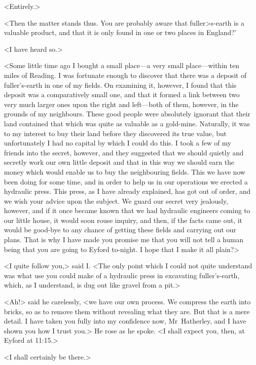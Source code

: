<Entirely.>

<Then the matter stands thus. You are probably aware that fuller>s-earth is a valuable product, and that it is only found in one or two places in England?'

<I have heard so.>

<Some little time ago I bought a small place—a very small place—within ten miles of Reading. I was fortunate enough to discover that there was a deposit of fuller's-earth in one of my fields. On examining it, however, I found that this deposit was a comparatively small one, and that it formed a link between two very much larger ones upon the right and left—both of them, however, in the grounds of my neighbours. These good people were absolutely ignorant that their land contained that which was quite as valuable as a gold-mine. Naturally, it was to my interest to buy their land before they discovered its true value, but unfortunately I had no capital by which I could do this. I took a few of my friends into the secret, however, and they suggested that we should quietly and secretly work our own little deposit and that in this way we should earn the money which would enable us to buy the neighbouring fields. This we have now been doing for some time, and in order to help us in our operations we erected a hydraulic press. This press, as I have already explained, has got out of order, and we wish your advice upon the subject. We guard our secret very jealously, however, and if it once became known that we had hydraulic engineers coming to our little house, it would soon rouse inquiry, and then, if the facts came out, it would be good-bye to any chance of getting these fields and carrying out our plans. That is why I have made you promise me that you will not tell a human being that you are going to Eyford to-night. I hope that I make it all plain?>

<I quite follow you,> said I\@. <The only point which I could not quite understand was what use you could make of a hydraulic press in excavating fuller's-earth, which, as I understand, is dug out like gravel from a pit.>

<Ah!> said he carelessly, <we have our own process. We compress the earth into bricks, so as to remove them without revealing what they are. But that is a mere detail. I have taken you fully into my confidence now, Mr~Hatherley, and I have shown you how I trust you.> He rose as he spoke. <I shall expect you, then, at Eyford at 11:15.>

<I shall certainly be there.>

